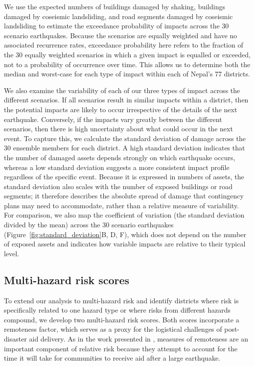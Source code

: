 \documentclass[preprint,12pt,authoryear]{elsarticle}
\begin{document}
We use the expected numbers of buildings damaged by shaking, buildings damaged by coseismic landsliding, and road segments damaged by coseismic landsliding to estimate the exceedance probability of impacts across the 30 scenario earthquakes. Because the scenarios are equally weighted and have no associated recurrence rates, exceedance probability here refers to the fraction of the 30 equally weighted scenarios in which a given impact is equalled or exceeded, not to a probability of occurrence over time. This allows us to determine both the median and worst-case for each type of impact within each of Nepal's 77 districts.

We also examine the variability of each of our three types of impact across the different scenarios. If all scenarios result in similar impacts within a district, then the potential impacts are likely to occur irrespective of the details of the next earthquake. Conversely, if the impacts vary greatly between the different scenarios, then there is high uncertainty about what could occur in the next event. To capture this, we calculate the standard deviation of damage across the 30 ensemble members for each district. A high standard deviation indicates that the number of damaged assets depends strongly on which earthquake occurs, whereas a low standard deviation suggests a more consistent impact profile regardless of the specific event. Because it is expressed in numbers of assets, the standard deviation also scales with the number of exposed buildings or road segments; it therefore describes the absolute spread of damage that contingency plans may need to accommodate, rather than a relative measure of variability. For comparison, we also map the coefficient of variation (the standard deviation divided by the mean) across the 30 scenario earthquakes (Figure~\ref{fig:standard_deviation}B, D, F), which does not depend on the number of exposed assets and indicates how variable impacts are relative to their typical level.

\subsection{Multi-hazard risk scores}

To extend our analysis to multi-hazard risk and identify districts where risk is specifically related to one hazard type or where risks from different hazards compound, we develop two multi-hazard risk scores. Both scores incorporate a remoteness factor, which serves as a proxy for the logistical challenges of post-disaster aid delivery. As in the work presented in \cite{Robinson2018}, measures of remoteness are an important component of relative risk because they attempt to account for the time it will take for communities to receive aid after a large earthquake.
\end{document}
